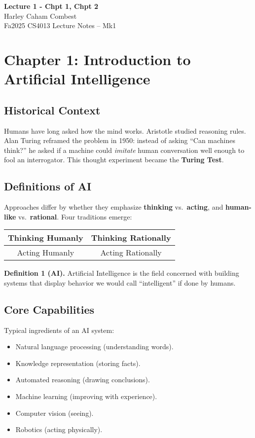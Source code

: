 \documentclass[12pt]{article}
\theoremstyle{definition}
\begin{document}
\begin{center}
\Large\textbf{Lecture 1 - Chpt 1, Chpt 2} \\
\large Harley Caham Combest \\
\large Fa2025 CS4013 Lecture Notes – Mk1
\end{center}

\vspace{1em}

\dotfill
\section*{Chapter 1: Introduction to Artificial Intelligence}
\dotfill

\subsection*{Historical Context}
Humans have long asked how the mind works. Aristotle studied reasoning rules.  
Alan Turing reframed the problem in 1950: instead of asking ``Can machines think?'' he asked
if a machine could \emph{imitate} human conversation well enough to fool an interrogator.
This thought experiment became the \textbf{Turing Test}.

\subsection*{Definitions of AI}
Approaches differ by whether they emphasize \textbf{thinking} vs.\ \textbf{acting}, and
\textbf{human-like} vs.\ \textbf{rational}. Four traditions emerge:
\begin{center}
    \begin{tabular}{|c|c|}
        \hline
        Thinking Humanly & Thinking Rationally \\
        \hline
        Acting Humanly & Acting Rationally \\
        \hline
    \end{tabular}
\end{center}

\noindent
\textbf{Definition 1 (AI).}  
Artificial Intelligence is the field concerned with building systems that display
behavior we would call ``intelligent'' if done by humans.

\subsection*{Core Capabilities}
Typical ingredients of an AI system:
\begin{itemize}[noitemsep]
    \item Natural language processing (understanding words).
    \item Knowledge representation (storing facts).
    \item Automated reasoning (drawing conclusions).
    \item Machine learning (improving with experience).
    \item Computer vision (seeing).
    \item Robotics (acting physically).
\end{itemize}
\end{document}
